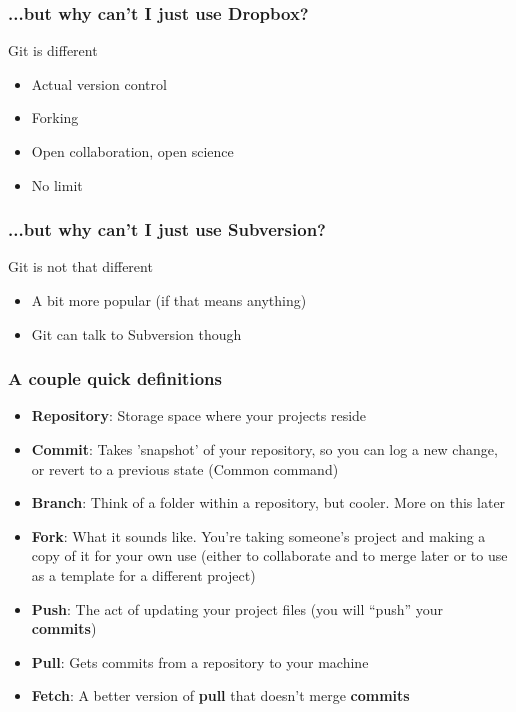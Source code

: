 \documentclass{beamer}\usepackage{graphicx, color}
\begin{document}
\begin{frame}
 \frametitle{...but why can't I just use Dropbox?}
\begin{block}{Git is different}
  \begin{itemize}
    \item Actual version control
    \item Forking
    \item Open collaboration, open science
    \item No limit 
  \end{itemize}
\end{block}
\end{frame}

\begin{frame}
 \frametitle{...but why can't I just use Subversion?}
\begin{block}{Git is not that different}
  \begin{itemize}
    \item A bit more popular (if that means anything)
    \item Git can talk to Subversion though
  \end{itemize}
\end{block}
\end{frame}



\begin{frame}
 \frametitle{A couple quick definitions}
  \begin{itemize}
    \item \textbf{Repository}: Storage space where your projects reside
    \pause
    \item \textbf{Commit}: Takes 'snapshot' of your repository, so you can log a new change, or revert to a previous state (Common command)
    \pause
    \item \textbf{Branch}: Think of a folder within a repository, but cooler. More on this later
    \pause
    \item \textbf{Fork}: What it sounds like. You're taking someone's project and making a copy of it for your own use (either to collaborate and to merge later or to use as a template for a different project)
    \pause
    \item \textbf{Push}: The act of updating your project files (you will ``push'' your \textbf{commits})
    \pause
    \item \textbf{Pull}: Gets commits from a repository to your machine
    \pause
    \item \textbf{Fetch}: A better version of \textbf{pull} that doesn't merge \textbf{commits}
  \end{itemize}
  \end{frame}
\end{document}
